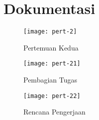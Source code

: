 \documentclass[12pt, a4paper]{article}
\begin{document}
\bigskip
\section*{Dokumentasi}
\begin{figure}[h]
    \centering
    \texttt{[image: pert-2]}
    \caption{Pertemuan Kedua}
\end{figure}

\begin{figure}[h]
    \centering
    \texttt{[image: pert-21]}
    \caption{Pembagian Tugas}
    \label{fig:pert-21}
\end{figure}

\begin{figure}[h]
    \centering
    \texttt{[image: pert-22]}
    \caption{Rencana Pengerjaan}
    \label{fig:pert-22}
\end{figure}
\end{document}
